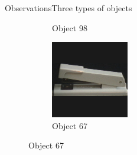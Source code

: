 \documentclass[aspectratio=169, handout, 10pt, hyperref=colorlinks]{beamer}
\begin{document}
\begin{frame}{Observations}{Three types of objects}
\begin{figure}
\begin{subfigure}{0.32\linewidth}
            \vspace{1em}
            \caption{Object 98}
        \end{subfigure}
        \begin{subfigure}{0.32\linewidth}
            \centering
            \includegraphics[width = 0.6\linewidth]{wireframe/obj68__0.png}
            \vspace{1em}
            \caption{Object 67}
        \end{subfigure}
    \end{figure}
\end{frame}
\end{document}
